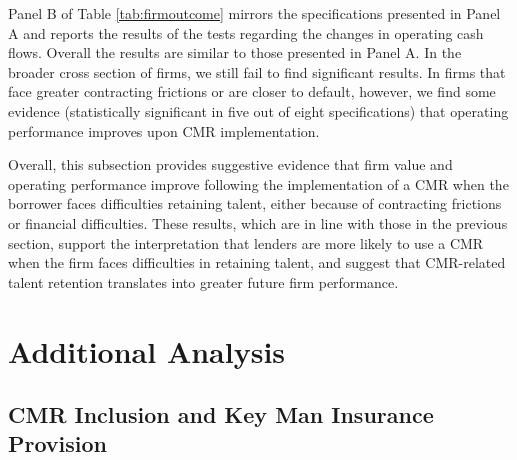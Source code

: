 \documentclass[a4paper,12pt]{article}
\begin{document}
Panel B of Table \ref{tab:firmoutcome} mirrors the specifications presented in Panel A and reports the results of the tests regarding the changes in operating cash flows.
Overall the results are similar to those presented in Panel A.
In the broader cross section of firms, we still fail to find significant results.
In firms that face greater contracting frictions or are closer to default, however, we find some evidence (statistically significant in five out of eight specifications) that operating performance improves upon CMR implementation. 


Overall, this subsection provides suggestive evidence that firm value and operating performance improve following the implementation of a CMR when the borrower faces difficulties retaining talent, either because of contracting frictions or financial difficulties.
These results, which are in line with those in the previous section, support the interpretation that lenders are more likely to use a CMR when the firm faces difficulties in retaining talent, and suggest that CMR-related talent retention translates into greater future firm performance.











\section{Additional Analysis}
\label{section:additional}

\subsection{CMR Inclusion and Key Man Insurance Provision}
\label{section:keyman}
\end{document}
